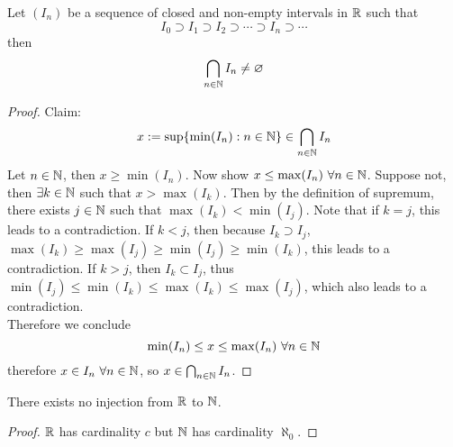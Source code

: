 \documentclass[11pt]{article}
\begin{document}
            \begin{theorem}
                Let $(I_n)$ be a sequence of closed and non-empty intervals in $\mathbb{R}$ such that
                \begin{equation}
                    I_0 \supset I_1 \supset I_2 \supset \cdots \supset I_n \supset \cdots
                \end{equation}
                then 
                \begin{equation}
                    \bigcap_{n \in \mathbb{N}} I_n \neq \varnothing
                \end{equation}
            \end{theorem}
            
            \begin{proof}
                Claim:
                \begin{equation}
                    x := \sup\{\min(I_n): n \in \mathbb{N}\} \in \bigcap_{n \in \mathbb{N}} I_n
                \end{equation}
                Let $n \in \mathbb{N}$, then $x \geq \min(I_n)$. Now show $x \leq \max(I_n)\ \forall n \in \mathbb{N}$. Suppose not, then $\exists k \in \mathbb{N}$ such that $x > \max(I_k)$. Then by the definition of supremum, there exists $j \in \mathbb{N}$ such that $\max(I_k) < \min(I_j)$. Note that if $k=j$, this leads to a contradiction. If $k < j$, then because $I_k\supset I_j$, $\max(I_k) \geq \max(I_j) \geq \min(I_j) \geq \min(I_k)$, this leads to a contradiction. If $k > j$, then $I_k \subset I_j$, thus $\min(I_j) \leq \min(I_k) \leq \max(I_k) \leq \max(I_j)$, which also leads to a contradiction.\\
                Therefore we conclude
                \begin{equation}
                    \min(I_n) \leq x \leq \max(I_n)\ \forall n \in \mathbb{N}
                \end{equation}
                therefore $x \in I_n\ \forall n \in \mathbb{N}$, so $x \in \bigcap_{n \in \mathbb{N}}I_n$.
            \end{proof}
            
            \begin{theorem}
                There exists no injection from $\mathbb{R}$ to $\mathbb{N}$.
            \end{theorem}
            
            \begin{proof}
                $\mathbb{R}$ has cardinality $c$ but $\mathbb{N}$ has cardinality $\aleph_0$.
            \end{proof}
            
\end{document}
